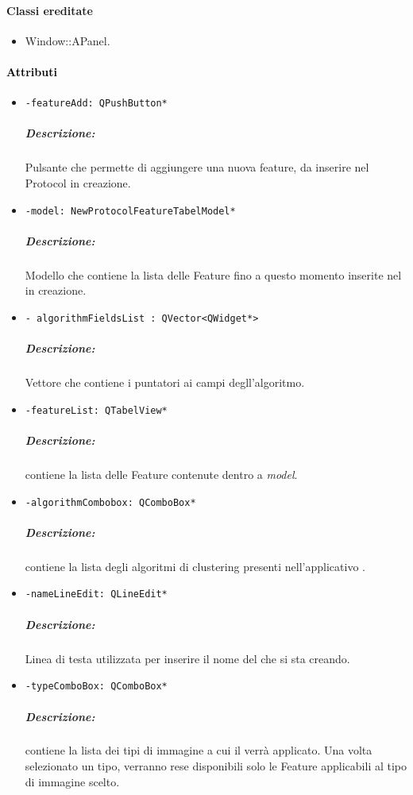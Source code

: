 \paragraph{Classi ereditate\\}
\begin{itemize}
\item Window::APanel.
\end{itemize}
\paragraph{\textcolor{black}{Attributi\\}}
\begin{itemize}
\item\color{teal}\verb!-featureAdd: QPushButton*!
\color{black}
\subparagraph{Descrizione:} Pulsante che permette di aggiungere una nuova feature, da inserire nel Protocol in creazione.

\item\color{teal}\verb!-model: NewProtocolFeatureTabelModel*!
\color{black}
\subparagraph{Descrizione:}
Modello che contiene la lista delle Feature fino a questo momento inserite nel \protocol{} in creazione.
\item\color{teal}\verb!- algorithmFieldsList : QVector<QWidget*>!
\color{black}
\subparagraph{Descrizione:}
Vettore che contiene i puntatori ai campi degll'algoritmo.

\item\color{teal}\verb!-featureList: QTabelView*!
\color{black}
\subparagraph{Descrizione:}contiene la lista delle Feature\g{} contenute dentro a \emph{model}. 

\item\color{teal}\verb!-algorithmCombobox: QComboBox*!
\color{black}
\subparagraph{Descrizione:}contiene la lista degli algoritmi di clustering\g{} presenti nell'applicativo \project{}. 

\item\color{teal}\verb!-nameLineEdit: QLineEdit*!
\color{black}
\subparagraph{Descrizione:}Linea di testa utilizzata per inserire il nome del \protocol{} che si sta creando. 

\item\color{teal}\verb!-typeComboBox: QComboBox*!
\color{black}
\subparagraph{Descrizione:}contiene la lista dei tipi di immagine a cui il \protocol{} verrà applicato. Una volta selezionato un tipo, verranno rese disponibili solo le Feature\g{} applicabili al tipo di immagine scelto.
\end{itemize}

